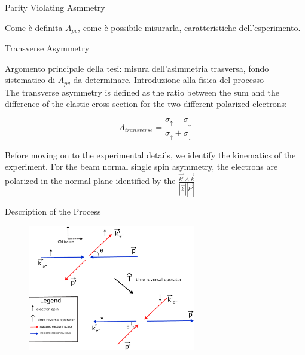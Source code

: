 \documentclass[8pt,a4paper]{beamer}
\begin{document}
\begin{frame}{Parity Violating Asmmetry}

Come è definita $A_{pv}$, come è possibile misurarla, caratteristiche dell'esperimento.

\end{frame}

\begin{frame}{Transverse Asymmetry}

Argomento principale della tesi: misura dell'asimmetria trasversa, fondo sistematico di $A_{pv}$ da determinare. Introduzione alla fisica del processo 
\\ 
The transverse asymmetry is defined as the ratio between the sum and the difference of the elastic cross section for the two different polarized electrons: 

\begin{equation*}
A_{transverse} = \dfrac{\sigma_{\uparrow} -  \sigma_{\downarrow}}{\sigma_{\uparrow} + \sigma_{\downarrow}}
\end{equation*}

Before moving on to the experimental details, we identify the kinematics of the experiment. For the beam normal single spin asymmetry, the electrons are polarized in the normal plane identified by the $\frac{\vec{k'} \wedge \vec{k}}{ |\vec{k}| |\vec{k'}|}$ 
\end{frame}

\begin{frame}{Description of the Process}

\begin{figure}[hbtp]
\centering
\includegraphics[width = 0.65\textwidth]{figures/scattering.pdf}
\hspace{1cm}
\end{figure}

\end{frame}
\end{document}
